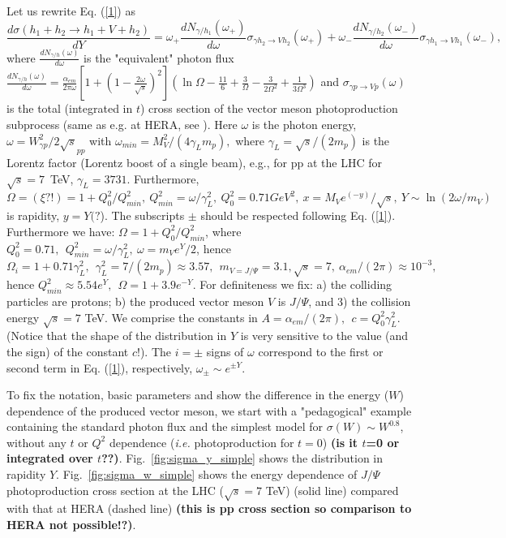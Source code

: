 \documentclass[12pt]{article}
\begin{document}
 Let us rewrite Eq. (\ref{1}) as
 \begin{equation}\label{1}
\frac{d\sigma (h_1+h_2\rightarrow h_1+V+h_2)}{dY}=\omega_+\frac{dN_{\gamma/h_1}(\omega_+)}{d\omega}\sigma_{\gamma h_2\rightarrow Vh_2}(\omega_+)+
\omega_-\frac{dN_{\gamma/h_2}(\omega_-)}{d\omega}\sigma_{\gamma h_1\rightarrow Vh_1}(\omega_-),
\end{equation}
where $\frac{dN_{\gamma/h}(\omega)}{d\omega}$ is the "equivalent" photon flux \cite{Review} 
$\frac{dN_{\gamma/h}(\omega)}{d\omega}=\frac{\alpha_{em}}{2\pi\omega}[1+(1-\frac{2\omega}{\sqrt{s}})^2]
(\ln\Omega-\frac{11}{6}+\frac{3}{\Omega}-\frac{3}{2\Omega^2}+\frac{1}{3\Omega^3})$
and $\sigma_{\gamma p\rightarrow Vp}(\omega)$ is the total (integrated in $t$) cross section of the vector meson photoproduction subprocess (same as e.g. at HERA, see \cite{Capua, Fazio}). Here $\omega$ is the photon energy, $\omega=W^2_{\gamma p}/2\sqrt s_{pp}$ with
$\omega_{min}=M_V^2/(4\gamma_Lm_p),$ where $\gamma_L=\sqrt s/(2m_p)$ 
is the Lorentz factor (Lorentz boost of a single beam), e.g., for pp at the LHC for $\sqrt{s}=7$~TeV,
$\gamma_L=3731$.
Furthermore,
$\Omega=(\xi ?!)=1+Q_0^2/Q_{min}^2,\  Q_{min}^2=\omega/\gamma_L^2,\   Q_0^2=0.71GeV^2,\   x=M_Ve^{(-y)}/\sqrt s,\  Y\sim\ln(2\omega/m_V)$ is rapidity, $y=Y(?$).
 The subscripts $\pm$ should be respected following Eq. (\ref{1}).
Furthermore we have: $\Omega=1+Q^2_0/Q^2_{min}$, where $Q_0^2=0.71,\ \ Q_{min}^2=\omega/\gamma^2_L,\ \omega=m_Ve^Y/2$, hence $\Omega_i=1+0.71\gamma_L^2,\ \ \gamma_L^2=7/(2m_p)\approx 3.57, \  \
m_{V=J/\Psi}=3.1, \sqrt{s}=7, \ \alpha_{em}/(2\pi)\approx 10^{-3},$ hence $Q^2_{min}\approx 5.54e^Y,\ \ \Omega=1+3.9e^{-Y}$. For definiteness we fix: a) the colliding particles are protons;
b) the produced vector meson $V$ is $J/\Psi$, and 3) the collision energy $\sqrt s=7$ TeV.
We comprise the constants in $A=\alpha_{em}/(2\pi),\ \  c=Q_0^2\gamma_L^2$.
(Notice that the shape of the distribution in $Y$ is very sensitive to the value (and the sign) of the constant $c$!). The $i=\pm$ signs of $\omega$ correspond to the first or second term in Eq. (\ref{1}), respectively, $\omega_{\pm}\sim e^{\pm Y}$.

To fix the notation, basic parameters and show the difference in the energy ($W$) dependence of the produced vector meson, we start with a "pedagogical" example containing the standard photon flux and the simplest model for $\sigma(W)\sim W^{0.8}$, without any $t$ or $Q^2$ dependence ({\it i.e.} photoproduction for $t=0$) {\bf(is it $t$=0 or integrated over $t$??)}.
Fig.~\ref{fig:sigma_y_simple} shows the distribution in rapidity $Y$. Fig.~\ref{fig:sigma_w_simple} shows the energy dependence of $J/\Psi$ photoproduction cross section at the LHC ($\sqrt{s}=7$ TeV) (solid line)
compared with that at HERA \cite{Fazio} (dashed line) {\bf (this is pp cross section so comparison to HERA not possible!?)}.
\end{document}
